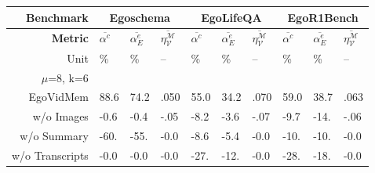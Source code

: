 \begin{table}[htbp]
    \centering
    \fontsize{7}{10}\selectfont
    \setlength{\tabcolsep}{6pt} %
    \renewcommand{\arraystretch}{1.4} %
    \centering
    \begin{tabular}{r|p{0.5cm}<{\centering}p{0.5cm}<{\centering}p{0.5cm}<{\centering}|p{0.5cm}<{\centering}p{0.5cm}<{\centering}p{0.5cm}<{\centering}|p{0.5cm}<{\centering}p{0.5cm}<{\centering}p{0.5cm}<{\centering}}
        \textbf{Benchmark} &
            \multicolumn{3}{c|}{\fontsize{10}{12}\selectfont Egoschema} &
            \multicolumn{3}{c|}{\fontsize{10}{12}\selectfont EgoLifeQA} &
            \multicolumn{3}{c}{\fontsize{10}{12}\selectfont EgoR1Bench}\\ \hline \hline
        \textbf{Metric}
        & $\overline{\alpha^c}$ & $\overline{\alpha^e_E}$ & $\overline{\eta^{\mathcal{M}}_{\mathcal{V}}}$
        & $\overline{\alpha^c}$ & $\overline{\alpha^e_E}$ & $\overline{\eta^{\mathcal{M}}_{\mathcal{V}}}$
        & $\overline{\alpha^c}$ & $\overline{\alpha^e_E}$ & $\overline{\eta^{\mathcal{M}}_{\mathcal{V}}}$
        \\
        Unit 
        & \% & \% & --
        & \% & \% & --
        & \% & \% & --
        \\  \hline
        $\mu$=8, k=6     &                          &                          &                          &                          &                          &                          &                          &                          &                          \\
        EgoVidMem        & 88.6                     & 74.2                     & .050                     & 55.0                     & 34.2                     & .070                     & 59.0                     & 38.7                     & .063                     \\ \hline
        w/o Images       & -0.6                     & -0.4                     & -.05\cellcolor{first!60} & -8.2                     & -3.6                     & -.07\cellcolor{first!60} & -9.7                     & -14.\cellcolor{second!60}& -.06\cellcolor{first!60} \\ 
        w/o Summary      & -60.\cellcolor{first!60} & -55.\cellcolor{first!60} & -0.0                     & -8.6                     & -5.4\cellcolor{third!60} & -0.0                     & -10.                     & -10.                     & -0.0                     \\ 
        w/o Transcripts  & -0.0                     & -0.0                     & -0.0                     & -27.\cellcolor{first!60} & -12.\cellcolor{first!60} & -0.0                     & -28.\cellcolor{first!60} & -18.\cellcolor{first!60} & -0.0                     \\ \hline

\end{tabular}
\end{table}

